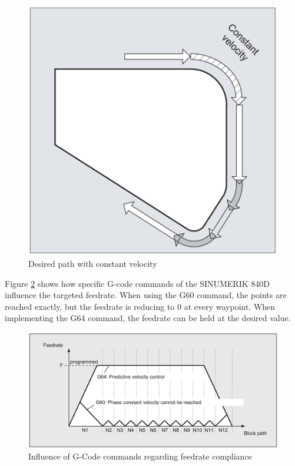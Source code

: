  \begin{figure}[H]
 	\centerline{\includegraphics[scale=.25]{figures/conti.png}}
 	\caption{Desired path with constant velocity~\cite{sinumericmanual}}
 	\label{C1}
 \end{figure}
 
Figure \ref{C2} shows how specific G-code commands of the SINUMERIK 840D influence the targeted feedrate. When using the G60 command, the points are reached exactly, but the feedrate is reducing to 0 at every waypoint. When implementing the G64 command, the feedrate can be held at the desired value.
 
 \begin{figure}[H]
 	\centerline{\includegraphics[scale=0.25]{figures/conti1.png}}
 	\caption{Influence of G-Code commands regarding feedrate compliance~\cite{sinumericmanual}}
 	\label{C2}
 \end{figure}
 
